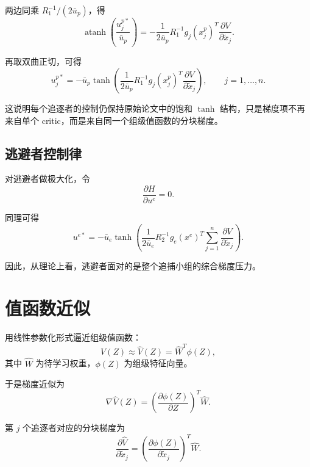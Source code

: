 ﻿\documentclass[12pt,a4paper]{ctexart}
\begin{document}
两边同乘 $R_1^{-1}/(2\bar u_p)$，得
\begin{equation}
    \operatorname{atanh}\!\left(\frac{u_j^{p*}}{\bar u_p}\right)
    =
    -\frac{1}{2\bar u_p}R_1^{-1}g_j(x_j^p)^T\frac{\partial V}{\partial \tilde x_j}.
\end{equation}

再取双曲正切，可得
\begin{equation}
    u_j^{p*}
    =
    -\bar u_p
    \tanh\!\left(
    \frac{1}{2\bar u_p}
    R_1^{-1}
    g_j(x_j^p)^T
    \frac{\partial V}{\partial \tilde x_j}
    \right),
    \qquad j=1,\dots,n.
\end{equation}

这说明每个追逐者的控制仍保持原始论文中的饱和 $\tanh$ 结构，只是梯度项不再来自单个 critic，而是来自同一个组级值函数的分块梯度。

\subsection{逃避者控制律}

对逃避者做极大化，令
\begin{equation}
    \frac{\partial H}{\partial u^e}=0.
\end{equation}

同理可得
\begin{equation}
    u^{e*}
    =
    -\bar u_e
    \tanh\!\left(
    \frac{1}{2\bar u_e}
    R_2^{-1}
    g_e(x^e)^T
    \sum_{j=1}^{n}\frac{\partial V}{\partial \tilde x_j}
    \right).
\end{equation}

因此，从理论上看，逃避者面对的是整个追捕小组的综合梯度压力。

\section{值函数近似}

用线性参数化形式逼近组级值函数：
\begin{equation}
    V(Z)\approx \hat V(Z)=\hat W^T\phi(Z),
\end{equation}
其中 $\hat W$ 为待学习权重，$\phi(Z)$ 为组级特征向量。

于是梯度近似为
\begin{equation}
    \nabla \hat V(Z)
    =
    \left(\frac{\partial \phi(Z)}{\partial Z}\right)^T\hat W.
\end{equation}

第 $j$ 个追逐者对应的分块梯度为
\begin{equation}
    \frac{\partial \hat V}{\partial \tilde x_j}
    =
    \left(\frac{\partial \phi(Z)}{\partial \tilde x_j}\right)^T\hat W.
\end{equation}
\end{document}
